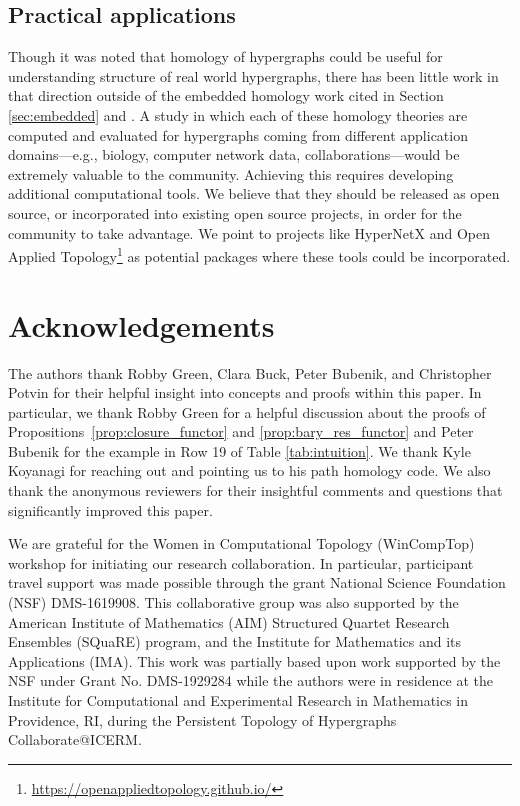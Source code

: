 \documentclass{amsart}
\begin{document}
\subsection*{Practical applications}
Though it was noted that homology of hypergraphs could be useful for understanding structure of real world hypergraphs, there has been little work in that direction outside of the embedded homology work cited in Section \ref{sec:embedded} and \cite{aktas2023hypergraph}. A study in which each of these homology theories are computed and evaluated for hypergraphs coming from different application domains---e.g., biology, computer network data, collaborations---would be extremely valuable to the community. Achieving this requires developing additional computational tools. We believe that they should be released as open source, or incorporated into existing open source projects, in order for the community to take advantage. We point to projects like HyperNetX and Open Applied Topology\footnote{\url{https://openappliedtopology.github.io/}} as potential packages where these tools could be incorporated.



\section*{Acknowledgements}

The authors thank Robby Green, Clara Buck, Peter Bubenik, and Christopher Potvin for their helpful insight into concepts and proofs within this paper. In particular, we thank Robby Green for a helpful discussion about the proofs of Propositions~\ref{prop:closure_functor} and \ref{prop:bary_res_functor} and Peter Bubenik for the example in Row 19 of Table \ref{tab:intuition}.
We thank Kyle Koyanagi for reaching out and pointing us to his path homology code.
We also thank the anonymous reviewers for their insightful comments and questions that significantly improved this paper.

We are grateful for the Women in Computational Topology (WinCompTop) workshop for initiating our research collaboration. In particular, participant travel support was made possible through the grant National Science Foundation (NSF) DMS-1619908. This collaborative group was also supported by the American Institute of Mathematics (AIM) Structured Quartet Research Ensembles (SQuaRE) program, and the Institute for Mathematics and its Applications (IMA). This work was partially based upon work supported by the NSF under Grant No. DMS-1929284 while the authors were in residence at the Institute for Computational and Experimental Research in Mathematics in Providence, RI, during the Persistent Topology of Hypergraphs Collaborate@ICERM.
\end{document}
